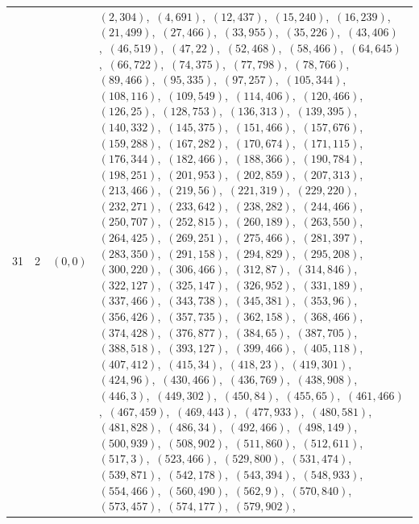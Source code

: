 \documentclass[11pt]{article}
\begin{document}
\begin{longtable}{@{}rrl>{\raggedright\arraybackslash}p{}@{}}
31 & 2 & $(0,0)$ & $(2,304)$,\allowbreak\ $(4,691)$,\allowbreak\ $(12,437)$,\allowbreak\ $(15,240)$,\allowbreak\ $(16,239)$,\allowbreak\ $(21,499)$,\allowbreak\ $(27,466)$,\allowbreak\ $(33,955)$,\allowbreak\ $(35,226)$,\allowbreak\ $(43,406)$,\allowbreak\ $(46,519)$,\allowbreak\ $(47,22)$,\allowbreak\ $(52,468)$,\allowbreak\ $(58,466)$,\allowbreak\ $(64,645)$,\allowbreak\ $(66,722)$,\allowbreak\ $(74,375)$,\allowbreak\ $(77,798)$,\allowbreak\ $(78,766)$,\allowbreak\ $(89,466)$,\allowbreak\ $(95,335)$,\allowbreak\ $(97,257)$,\allowbreak\ $(105,344)$,\allowbreak\ $(108,116)$,\allowbreak\ $(109,549)$,\allowbreak\ $(114,406)$,\allowbreak\ $(120,466)$,\allowbreak\ $(126,25)$,\allowbreak\ $(128,753)$,\allowbreak\ $(136,313)$,\allowbreak\ $(139,395)$,\allowbreak\ $(140,332)$,\allowbreak\ $(145,375)$,\allowbreak\ $(151,466)$,\allowbreak\ $(157,676)$,\allowbreak\ $(159,288)$,\allowbreak\ $(167,282)$,\allowbreak\ $(170,674)$,\allowbreak\ $(171,115)$,\allowbreak\ $(176,344)$,\allowbreak\ $(182,466)$,\allowbreak\ $(188,366)$,\allowbreak\ $(190,784)$,\allowbreak\ $(198,251)$,\allowbreak\ $(201,953)$,\allowbreak\ $(202,859)$,\allowbreak\ $(207,313)$,\allowbreak\ $(213,466)$,\allowbreak\ $(219,56)$,\allowbreak\ $(221,319)$,\allowbreak\ $(229,220)$,\allowbreak\ $(232,271)$,\allowbreak\ $(233,642)$,\allowbreak\ $(238,282)$,\allowbreak\ $(244,466)$,\allowbreak\ $(250,707)$,\allowbreak\ $(252,815)$,\allowbreak\ $(260,189)$,\allowbreak\ $(263,550)$,\allowbreak\ $(264,425)$,\allowbreak\ $(269,251)$,\allowbreak\ $(275,466)$,\allowbreak\ $(281,397)$,\allowbreak\ $(283,350)$,\allowbreak\ $(291,158)$,\allowbreak\ $(294,829)$,\allowbreak\ $(295,208)$,\allowbreak\ $(300,220)$,\allowbreak\ $(306,466)$,\allowbreak\ $(312,87)$,\allowbreak\ $(314,846)$,\allowbreak\ $(322,127)$,\allowbreak\ $(325,147)$,\allowbreak\ $(326,952)$,\allowbreak\ $(331,189)$,\allowbreak\ $(337,466)$,\allowbreak\ $(343,738)$,\allowbreak\ $(345,381)$,\allowbreak\ $(353,96)$,\allowbreak\ $(356,426)$,\allowbreak\ $(357,735)$,\allowbreak\ $(362,158)$,\allowbreak\ $(368,466)$,\allowbreak\ $(374,428)$,\allowbreak\ $(376,877)$,\allowbreak\ $(384,65)$,\allowbreak\ $(387,705)$,\allowbreak\ $(388,518)$,\allowbreak\ $(393,127)$,\allowbreak\ $(399,466)$,\allowbreak\ $(405,118)$,\allowbreak\ $(407,412)$,\allowbreak\ $(415,34)$,\allowbreak\ $(418,23)$,\allowbreak\ $(419,301)$,\allowbreak\ $(424,96)$,\allowbreak\ $(430,466)$,\allowbreak\ $(436,769)$,\allowbreak\ $(438,908)$,\allowbreak\ $(446,3)$,\allowbreak\ $(449,302)$,\allowbreak\ $(450,84)$,\allowbreak\ $(455,65)$,\allowbreak\ $(461,466)$,\allowbreak\ $(467,459)$,\allowbreak\ $(469,443)$,\allowbreak\ $(477,933)$,\allowbreak\ $(480,581)$,\allowbreak\ $(481,828)$,\allowbreak\ $(486,34)$,\allowbreak\ $(492,466)$,\allowbreak\ $(498,149)$,\allowbreak\ $(500,939)$,\allowbreak\ $(508,902)$,\allowbreak\ $(511,860)$,\allowbreak\ $(512,611)$,\allowbreak\ $(517,3)$,\allowbreak\ $(523,466)$,\allowbreak\ $(529,800)$,\allowbreak\ $(531,474)$,\allowbreak\ $(539,871)$,\allowbreak\ $(542,178)$,\allowbreak\ $(543,394)$,\allowbreak\ $(548,933)$,\allowbreak\ $(554,466)$,\allowbreak\ $(560,490)$,\allowbreak\ $(562,9)$,\allowbreak\ $(570,840)$,\allowbreak\ $(573,457)$,\allowbreak\ $(574,177)$,\allowbreak\ $(579,902)$,\allowbreak\ 
\end{longtable}
\end{document}
